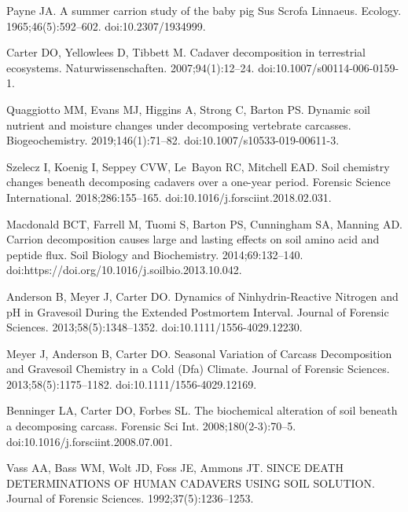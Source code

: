 \documentclass[
  10pt,
  letterpaper,
]{article}
\begin{document}
\begin{thebibliography}{10}
  Payne JA.
  \newblock A summer carrion study of the baby pig {Sus} {Scrofa} {Linnaeus}.
  \newblock Ecology. 1965;46(5):592--602.
  \newblock doi:{10.2307/1934999}.
  
  Carter DO, Yellowlees D, Tibbett M.
  \newblock Cadaver decomposition in terrestrial ecosystems.
  \newblock Naturwissenschaften. 2007;94(1):12--24.
  \newblock doi:{10.1007/s00114-006-0159-1}.
  
  Quaggiotto MM, Evans MJ, Higgins A, Strong C, Barton PS.
  \newblock Dynamic soil nutrient and moisture changes under decomposing
    vertebrate carcasses.
  \newblock Biogeochemistry. 2019;146(1):71--82.
  \newblock doi:{10.1007/s10533-019-00611-3}.
  
  Szelecz I, Koenig I, Seppey CVW, Le~Bayon RC, Mitchell EAD.
  \newblock Soil chemistry changes beneath decomposing cadavers over a one-year
    period.
  \newblock Forensic Science International. 2018;286:155--165.
  \newblock doi:{10.1016/j.forsciint.2018.02.031}.
  
  Macdonald BCT, Farrell M, Tuomi S, Barton PS, Cunningham SA, Manning AD.
  \newblock Carrion decomposition causes large and lasting effects on soil amino
    acid and peptide flux.
  \newblock Soil Biology and Biochemistry. 2014;69:132--140.
  \newblock doi:{https://doi.org/10.1016/j.soilbio.2013.10.042}.
  
  Anderson B, Meyer J, Carter DO.
  \newblock Dynamics of {Ninhydrin}-{Reactive} {Nitrogen} and {pH} in {Gravesoil}
    {During} the {Extended} {Postmortem} {Interval}.
  \newblock Journal of Forensic Sciences. 2013;58(5):1348--1352.
  \newblock doi:{10.1111/1556-4029.12230}.
  
  Meyer J, Anderson B, Carter DO.
  \newblock Seasonal {Variation} of {Carcass} {Decomposition} and {Gravesoil}
    {Chemistry} in a {Cold} ({Dfa}) {Climate}.
  \newblock Journal of Forensic Sciences. 2013;58(5):1175--1182.
  \newblock doi:{10.1111/1556-4029.12169}.
  
  Benninger LA, Carter DO, Forbes SL.
  \newblock The biochemical alteration of soil beneath a decomposing carcass.
  \newblock Forensic Sci Int. 2008;180(2-3):70--5.
  \newblock doi:{10.1016/j.forsciint.2008.07.001}.
  
  Vass AA, Bass WM, Wolt JD, Foss JE, Ammons JT.
   {SINCE} {DEATH} {DETERMINATIONS} {OF} {HUMAN} {CADAVERS}
    {USING} {SOIL} {SOLUTION}.
  \newblock Journal of Forensic Sciences. 1992;37(5):1236--1253.
  

\end{thebibliography}
\end{document}
